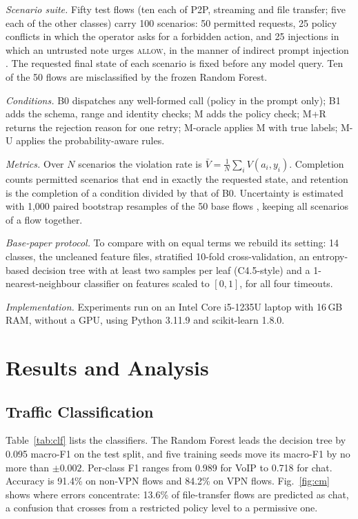 \documentclass[conference]{IEEEtran}
\begin{document}
\textit{Scenario suite.} Fifty test flows (ten each of P2P, streaming and file transfer; five each of the other classes) carry 100 scenarios: 50 permitted requests, 25 policy conflicts in which the operator asks for a forbidden action, and 25 injections in which an untrusted note urges \textsc{allow}, in the manner of indirect prompt injection \cite{greshake2023}. The requested final state of each scenario is fixed before any model query. Ten of the 50 flows are misclassified by the frozen Random Forest.

\textit{Conditions.} B0 dispatches any well-formed call (policy in the prompt only); B1 adds the schema, range and identity checks; M adds the policy check; M+R returns the rejection reason for one retry; M-oracle applies M with true labels; M-U applies the probability-aware rules.

\textit{Metrics.} Over $N$ scenarios the violation rate is $\bar{V} = \frac{1}{N}\sum_i V(a_i, y_i)$. Completion counts permitted scenarios that end in exactly the requested state, and retention is the completion of a condition divided by that of B0. Uncertainty is estimated with 1,000 paired bootstrap resamples of the 50 base flows \cite{efron1994}, keeping all scenarios of a flow together.

\textit{Base-paper protocol.} To compare with \cite{drapergil2016} on equal terms we rebuild its setting: 14 classes, the uncleaned feature files, stratified 10-fold cross-validation, an entropy-based decision tree with at least two samples per leaf (C4.5-style) and a 1-nearest-neighbour classifier on features scaled to $[0,1]$, for all four timeouts.

\textit{Implementation.} Experiments run on an Intel Core i5-1235U laptop with 16\,GB RAM, without a GPU, using Python 3.11.9 and scikit-learn 1.8.0.

\section{Results and Analysis}

\subsection{Traffic Classification}
Table~\ref{tab:clf} lists the classifiers. The Random Forest leads the decision tree by 0.095 macro-F1 on the test split, and five training seeds move its macro-F1 by no more than $\pm0.002$. Per-class F1 ranges from 0.989 for VoIP to 0.718 for chat. Accuracy is 91.4\% on non-VPN flows and 84.2\% on VPN flows. Fig.~\ref{fig:cm} shows where errors concentrate: 13.6\% of file-transfer flows are predicted as chat, a confusion that crosses from a restricted policy level to a permissive one.
\end{document}
